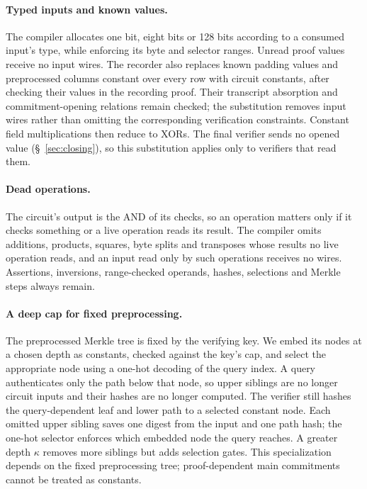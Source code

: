 \documentclass[11pt]{article}
\newcommand{\AND}{\textsf{AND}}
\newcommand{\XOR}{\textsf{XOR}}
\begin{document}
\paragraph{Typed inputs and known values.} The compiler allocates one bit,
eight bits or 128 bits according to a consumed input's type, while enforcing
its byte and selector ranges. Unread proof values receive no input wires.
The recorder also replaces known padding values and preprocessed columns
constant over every row with circuit constants, after checking their values
in the recording proof. Their transcript absorption and commitment-opening
relations remain checked; the substitution removes input wires rather than
omitting the corresponding verification constraints. Constant field
multiplications then reduce to \XOR{}s. The final verifier sends no opened
value (\S~\ref{sec:closing}), so this substitution applies only to verifiers
that read them.

\paragraph{Dead operations.} The circuit's output is the \AND{} of its
checks, so an operation matters only if it checks something or a live
operation reads its result. The compiler omits additions, products,
squares, byte splits and transposes whose results no live operation reads,
and an input read only by such operations receives no wires. Assertions,
inversions, range-checked operands, hashes, selections and Merkle steps
always remain.

\paragraph{A deep cap for fixed preprocessing.} The preprocessed Merkle tree
is fixed by the verifying key. We embed its nodes at a chosen depth as
constants, checked against the key's cap, and select the appropriate node
using a one-hot decoding of the query index. A query authenticates only the
path below that node, so upper siblings are no longer circuit inputs and
their hashes are no longer computed. The verifier still hashes the
query-dependent leaf and lower path to a selected constant node. Each
omitted upper sibling saves one digest from the input and one path hash;
the one-hot selector enforces which embedded node the query reaches.
A greater depth $\kappa$ removes more siblings but adds selection gates. This
specialization depends on the fixed preprocessing tree; proof-dependent
main commitments cannot be treated as constants.
\end{document}

